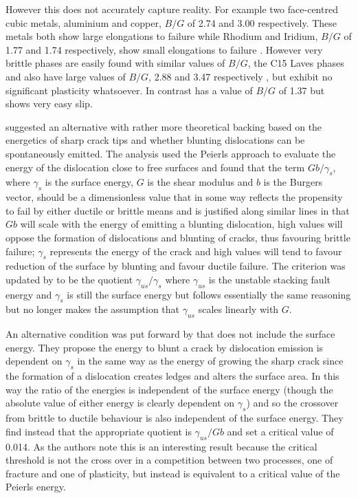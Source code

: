 However this does not accurately capture reality. For example two face-centred cubic metals, aluminium and copper, $B/G$ of 2.74 and 3.00 respectively. These metals both show large elongations to failure while Rhodium and Iridium, $B/G$ of 1.77 and 1.74 respectively, show small elongations to failure \cite{Pugh1954}. However very brittle phases are easily found with similar values of $B/G$, the C15 Laves phases \cite{Stein2004,Stein2005}  and  also have large values of $B/G$, 2.88 and 3.47 respectively \cite{Chu1995}, but exhibit no significant plasticity whatsoever. In contrast  has a value of $B/G$ of 1.37 \cite{Barsoum2011} but shows very easy slip.






\citet{rice1974} suggested an alternative with rather more theoretical backing based on the energetics of sharp crack tips and whether blunting dislocations can be spontaneously emitted. The analysis used the Peierls approach to evaluate the energy of the dislocation close to free surfaces and found that the term $Gb/\gamma_s$, where $\gamma_s$ is the surface energy, $G$ is the shear modulus and $b$ is the Burgers vector, should be a dimensionless value that in some way reflects the propensity to fail by either ductile or brittle means and is justified along similar lines in that $Gb$ will scale with the energy of emitting a blunting dislocation, high values will oppose the formation of dislocations and blunting of cracks, thus favouring brittle failure; $\gamma_s$ represents the energy of the crack and high values will tend to favour reduction of the surface by blunting and favour ductile failure. The criterion was updated by \citet{Rice1992} to be the quotient $\gamma_{us}/ \gamma_s$ where $\gamma_{us}$ is the unstable stacking fault energy and $\gamma_s$ is still the surface energy but follows essentially the same reasoning but no longer makes the assumption that $\gamma_{us}$ scales linearly with $G$.

An alternative condition was put forward by \citet{Zhou1994} that does not include the surface energy. They propose the energy to blunt a crack by dislocation emission is dependent on $\gamma_s$ in the same way as the energy of growing the sharp crack since the formation of a dislocation creates ledges and alters the surface area. In this way the ratio of the energies is independent of the surface energy (though the absolute value of either energy is clearly dependent on $\gamma_s$) and so the crossover from brittle to ductile behaviour is also independent of the surface energy. They find instead that the appropriate quotient is $\gamma_{us} / Gb$ and set a critical value of 0.014. As the authors note this is an interesting result because the critical threshold is not the cross over in a competition between two processes, one of fracture and one of plasticity, but instead is equivalent to a critical value of the Peierls energy.

